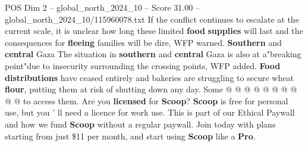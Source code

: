 \begin{textsample}{POS Dim 2 – global\_north\_2024\_10 – Score 31.00 – global\_north\_2024\_10/115960078.txt}
If the conflict continues to escalate at the current scale, it is unclear how long these limited \textbf{food} \textbf{supplies} will last and the consequences for \textbf{fleeing} families will be dire, WFP warned. \textbf{Southern} and \textbf{central} Gaza The situation in \textbf{southern} and \textbf{central} Gaza is also at a"breaking point"due to insecurity surrounding the crossing points, WFP added. \textbf{Food} \textbf{distributions} have ceased entirely and bakeries are struggling to secure wheat \textbf{flour}, putting them at risk of shutting down any day.
Some @ @ @ @ @ @ @ @ @ @ to access them.
Are you \textbf{licensed} for \textbf{Scoop}? \textbf{Scoop} is free for personal use, but you ' ll need a licence for work use.
This is part of our Ethical Paywall and how we fund \textbf{Scoop} without a regular paywall.
Join today with plans starting from just \$11 per month, and start using \textbf{Scoop} like a \textbf{Pro}.

\end{textsample}
